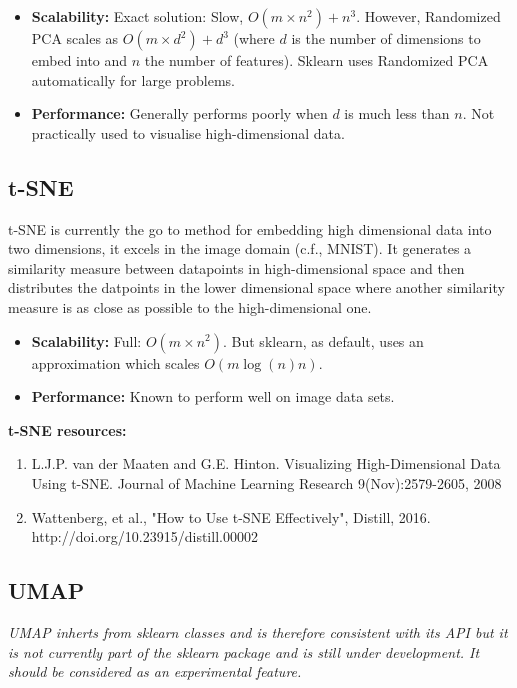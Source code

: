 \documentclass[11pt]{article} %
\begin{document}
\begin{itemize}
\item \textbf{Scalability:} Exact solution: Slow, $O(m \times n^2) + n^3$. However, Randomized PCA scales as $O(m \times d^2) + d^3$ (where $d$ is the number of dimensions to embed into and $n$ the number of features). Sklearn uses Randomized PCA automatically for large problems.
\item \textbf{Performance:} Generally performs poorly when $d$ is much less than $n$. Not practically used to visualise high-dimensional data.
\end{itemize}

\subsection{t-SNE}

t-SNE is currently the go to method for embedding high dimensional data into two dimensions, it excels in the image domain (c.f., MNIST). It generates a similarity measure between datapoints in high-dimensional space  and then distributes the datpoints in the lower dimensional space where another similarity measure is as close as possible to the high-dimensional one.

\begin{itemize}
	\item \textbf{Scalability:}  Full: $O(m \times n^2)$. But sklearn, as default, uses an approximation which scales $O(m\log(n)n)$.	
	\item \textbf{Performance:}  Known to perform well on image data sets.
\end{itemize}

\textbf{t-SNE resources:}

\begin{enumerate}
	\item L.J.P. van der Maaten and G.E. Hinton. Visualizing High-Dimensional Data Using t-SNE. Journal of Machine Learning Research 9(Nov):2579-2605, 2008
	\item Wattenberg, et al., "How to Use t-SNE Effectively", Distill, 2016. http://doi.org/10.23915/distill.00002
\end{enumerate}

\subsection{UMAP}

\textit{UMAP inherts from  sklearn classes and is therefore consistent with its API but it is not currently part of the sklearn package and is still under development. It should be considered as an experimental feature.}
\end{document}

